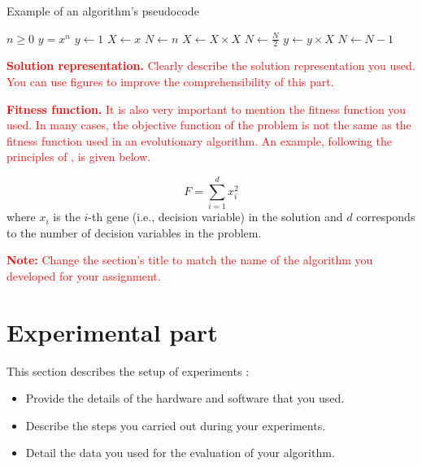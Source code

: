 \documentclass{scrartcl}
\begin{document}
\begin{algorithm}
\caption{Example of an algorithm's pseudocode}\label{alg:pseudocode_example}
\begin{algorithmic}
\Require $n \geq 0$
\Ensure $y = x^n$
\State $y \gets 1$
\State $X \gets x$
\State $N \gets n$
    \State $X \gets X \times X$
    \State $N \gets \frac{N}{2}$  
    \State $y \gets y \times X$
    \State $N \gets N - 1$
\EndIf
\EndWhile
\end{algorithmic}
\end{algorithm}

\textcolor{red}{\textbf{Solution representation.} Clearly describe the solution representation you used. You can use figures to improve the comprehensibility of this part.}

\textcolor{red}{\textbf{Fitness function.} It is also very important to mention the fitness function you used. In many cases, the objective function of the problem is not the same as the fitness function used in an evolutionary algorithm. An example, following the principles of \cite{zobel2014mathematics}, is given below.}

\begin{equation}
    F = \sum_{i=1}^d x_i^2 
\end{equation}
where $x_i$ is the $i$-th gene (i.e., decision variable) in the solution and $d$ corresponds to the number of decision variables in the problem.

\textcolor{red}{\textbf{Note:} Change the section's title to match the name of the algorithm you developed for your assignment.}

\lipsum[3]


\section{Experimental part}
\label{sec:experimentation}

{\color{red}
This section describes the setup of experiments \cite{zobel2014experimentation}:

\begin{itemize}
    \item Provide the details of the hardware and software that you used.
    \item Describe the steps you carried out during your experiments.
    \item Detail the data you used for the evaluation of your algorithm.
\end{itemize}
}
\end{document}
